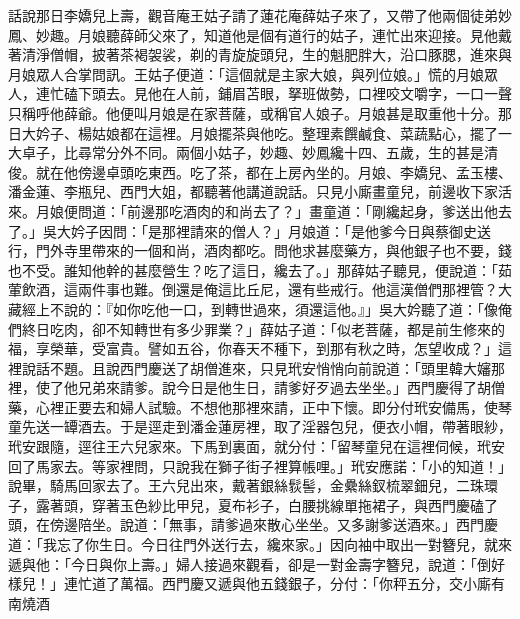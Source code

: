 \begin{showcontents}{}
話說那日李嬌兒上壽，觀音庵王姑子請了蓮花庵薛姑子來了，又帶了他兩個徒弟妙鳳、妙趣。月娘聽薛師父來了，知道他是個有道行的姑子，連忙出來迎接。見他戴著清淨僧帽，披著茶褐袈裟，剃的青旋旋頭兒，生的魁肥胖大，沿口豚腮，進來與月娘眾人合掌問訊。王姑子便道：「這個就是主家大娘，與列位娘。」慌的月娘眾人，連忙磕下頭去。見他在人前，鋪眉苫眼，拏班做勢，口裡咬文嚼字，一口一聲只稱呼他薛爺。他便叫月娘是在家菩薩，或稱官人娘子。月娘甚是取重他十分。那日大妗子、楊姑娘都在這裡。月娘擺茶與他吃。整理素饌鹹食、菜蔬點心，擺了一大卓子，比尋常分外不同。兩個小姑子，妙趣、妙鳳纔十四、五歲，生的甚是清俊。就在他傍邊卓頭吃東西。吃了茶，都在上房內坐的。月娘、李嬌兒、孟玉樓、潘金蓮、李瓶兒、西門大姐，都聽著他講道說話。只見小廝畫童兒，前邊收下家活來。月娘便問道：「前邊那吃酒肉的和尚去了？」畫童道：「剛纔起身，爹送出他去了。」吳大妗子因問：「是那裡請來的僧人？」月娘道：「是他爹今日與蔡御史送行，門外寺里帶來的一個和尚，酒肉都吃。問他求甚麼藥方，與他銀子也不要，錢也不受。誰知他幹的甚麼營生？吃了這日，纔去了。」那薛姑子聽見，便說道：「茹葷飲酒，這兩件事也難。倒還是俺這比丘尼，還有些戒行。他這漢僧們那裡管？大藏經上不說的：『如你吃他一口，到轉世過來，須還這他。』」吳大妗聽了道：「像俺們終日吃肉，卻不知轉世有多少罪業？」薛姑子道：「似老菩薩，都是前生修來的福，享榮華，受富貴。譬如五谷，你春天不種下，到那有秋之時，怎望收成？」這裡說話不題。且說西門慶送了胡僧進來，只見玳安悄悄向前說道：「頭里韓大嬸那裡，使了他兄弟來請爹。說今日是他生日，請爹好歹過去坐坐。」西門慶得了胡僧藥，心裡正要去和婦人試驗。不想他那裡來請，正中下懷。即分付玳安備馬，使琴童先送一罈酒去。于是逕走到潘金蓮房裡，取了淫器包兒，便衣小帽，帶著眼紗，玳安跟隨，逕往王六兒家來。下馬到裏面，就分付：「留琴童兒在這裡伺候，玳安回了馬家去。等家裡問，只說我在獅子街子裡算帳哩。」玳安應諾：「小的知道！」說畢，騎馬回家去了。王六兒出來，戴著銀絲䯼髻，金纍絲釵梳翠鈿兒，二珠環子，露著頭，穿著玉色紗比甲兒，夏布衫子，白腰挑線單拖裙子，與西門慶磕了頭，在傍邊陪坐。說道：「無事，請爹過來散心坐坐。又多謝爹送酒來。」西門慶道：「我忘了你生日。今日往門外送行去，纔來家。」因向袖中取出一對簪兒，就來遞與他：「今日與你上壽。」婦人接過來觀看，卻是一對金壽字簪兒，說道：「倒好樣兒！」連忙道了萬福。西門慶又遞與他五錢銀子，分付：「你秤五分，交小廝有南燒酒 
\end{showcontents}
